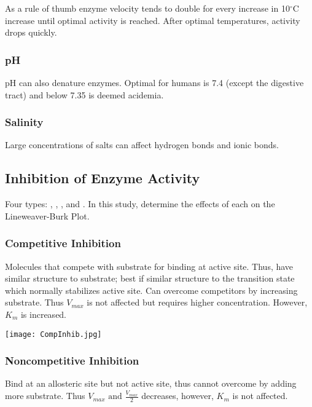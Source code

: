 \documentclass[../Bio_chemistryReview.tex]{subfiles}
\begin{document}
As a rule of thumb enzyme velocity tends to double for every increase in 10$
^{\circ} $C increase until optimal activity is reached. After optimal
temperatures, activity drops quickly.

\subsubsection{pH\supdag}

pH can also denature enzymes. Optimal for humans is 7.4 (except the digestive
tract) and below 7.35 is deemed acidemia. 

\subsubsection{Salinity\supdag}

Large concentrations of salts can affect hydrogen bonds and ionic bonds.

\subsection{Inhibition of Enzyme Activity}

Four types: ,  ,  , and . In this study, determine the effects of each on the Lineweaver-Burk
Plot.

\subsubsection{Competitive Inhibition\supddag}

Molecules that compete with substrate for binding at active site. Thus, have
similar structure to substrate; best if similar structure to the transition
state which normally stabilizes active site. Can overcome competitors by
increasing substrate. Thus $ V_{max} $ is not affected but requires higher
concentration. However, $ K_{m} $ is increased.

\begin{center}
  \texttt{[image: CompInhib.jpg]}
\end{center}

\subsubsection{Noncompetitive Inhibition}

Bind at an allosteric site but not active site, thus cannot overcome by adding
more substrate. Thus $ V_{max} \text{ and } \tfrac{V_{max}}{2}$ decreases,
however, $ K_{m} $ is not affected.
\end{document}

